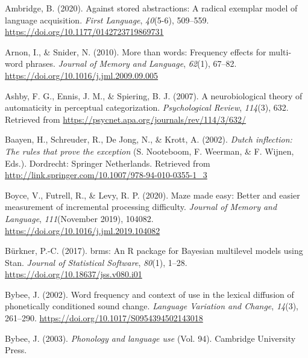 \documentclass[
  man,floatsintext]{apa6}
\newlength{\cslhangindent}
\newlength{\cslentryspacingunit} %
\newenvironment{CSLReferences}[2] %
 {%
  \setlength{\parindent}{0pt}
  \ifodd #1
  \let\oldpar\par
  \def\par{\hangindent=\cslhangindent\oldpar}
  \fi
  \setlength{\parskip}{#2\cslentryspacingunit}
 }%
 {}
\begin{document}
\hypertarget{refs}{}
\begin{CSLReferences}{1}{0}
\leavevmode{}%
Ambridge, B. (2020). Against stored abstractions: A radical exemplar model of language acquisition. \emph{First Language}, \emph{40}(5-6), 509--559. \url{https://doi.org/10.1177/0142723719869731}

\leavevmode{}%
Arnon, I., \& Snider, N. (2010). More than words: Frequency effects for multi-word phrases. \emph{Journal of Memory and Language}, \emph{62}(1), 67--82. \url{https://doi.org/10.1016/j.jml.2009.09.005}

\leavevmode{}%
Ashby, F. G., Ennis, J. M., \& Spiering, B. J. (2007). A neurobiological theory of automaticity in perceptual categorization. \emph{Psychological Review}, \emph{114}(3), 632. Retrieved from \url{https://psycnet.apa.org/journals/rev/114/3/632/}

\leavevmode{}%
Baayen, H., Schreuder, R., De Jong, N., \& Krott, A. (2002). \emph{Dutch inflection: The rules that prove the exception} (S. Nooteboom, F. Weerman, \& F. Wijnen, Eds.). Dordrecht: Springer Netherlands. Retrieved from \url{http://link.springer.com/10.1007/978-94-010-0355-1_3}

\leavevmode{}%
Boyce, V., Futrell, R., \& Levy, R. P. (2020). Maze made easy: Better and easier measurement of incremental processing difficulty. \emph{Journal of Memory and Language}, \emph{111}(November 2019), 104082. \url{https://doi.org/10.1016/j.jml.2019.104082}

\leavevmode{}%
Bürkner, P.-C. (2017). {brms}: An {R} package for {Bayesian} multilevel models using {Stan}. \emph{Journal of Statistical Software}, \emph{80}(1), 1--28. \url{https://doi.org/10.18637/jss.v080.i01}

\leavevmode{}%
Bybee, J. (2002). Word frequency and context of use in the lexical diffusion of phonetically conditioned sound change. \emph{Language Variation and Change}, \emph{14}(3), 261--290. \url{https://doi.org/10.1017/S0954394502143018}

\leavevmode{}%
Bybee, J. (2003). \emph{Phonology and language use} (Vol. 94). Cambridge University Press.


\end{CSLReferences}
\end{document}
